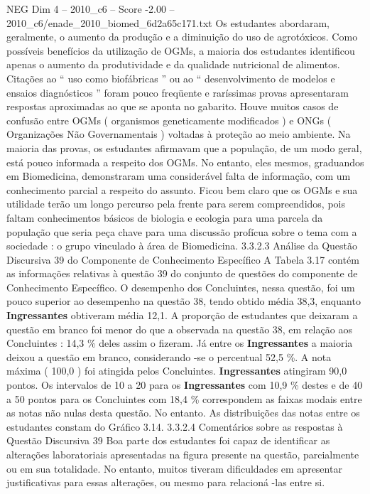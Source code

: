 \begin{textsample}{NEG Dim 4 – 2010\_c6 – Score -2.00 – 2010\_c6/enade\_2010\_biomed\_6d2a65c171.txt}
Os estudantes abordaram, geralmente, o aumento da produção e a diminuição do uso de agrotóxicos.
Como possíveis benefícios da utilização de OGMs, a maioria dos estudantes identificou apenas o aumento da produtividade e da qualidade nutricional de alimentos.
Citações ao “ uso como biofábricas ” ou ao “ desenvolvimento de modelos e ensaios diagnósticos ” foram pouco freqüente e raríssimas provas apresentaram respostas aproximadas ao que se aponta no gabarito.
Houve muitos casos de confusão entre OGMs ( organismos geneticamente modificados ) e ONGs ( Organizações Não Governamentais ) voltadas à proteção ao meio ambiente.
Na maioria das provas, os estudantes afirmavam que a população, de um modo geral, está pouco informada a respeito dos OGMs.
No entanto, eles mesmos, graduandos em Biomedicina, demonstraram uma considerável falta de informação, com um conhecimento parcial a respeito do assunto.
Ficou bem claro que os OGMs e sua utilidade terão um longo percurso pela frente para serem compreendidos, pois faltam conhecimentos básicos de biologia e ecologia para uma parcela da população que seria peça chave para uma discussão profícua sobre o tema com a sociedade : o grupo vinculado à área de Biomedicina. 3.3.2.3 Análise da Questão Discursiva 39 do Componente de Conhecimento Específico A Tabela 3.17 contém as informações relativas à questão 39 do conjunto de questões do componente de Conhecimento Específico.
O desempenho dos Concluintes, nessa questão, foi um pouco superior ao desempenho na questão 38, tendo obtido média 38,3, enquanto \textbf{Ingressantes} obtiveram média 12,1.
A proporção de estudantes que deixaram a questão em branco foi menor do que a observada na questão 38, em relação aos Concluintes : 14,3 \% deles assim o fizeram.
Já entre os \textbf{Ingressantes} a maioria deixou a questão em branco, considerando -se o percentual 52,5 \%.
A nota máxima ( 100,0 ) foi atingida pelos Concluintes. \textbf{Ingressantes} atingiram 90,0 pontos.
Os intervalos de 10 a 20 para os \textbf{Ingressantes} com 10,9 \% destes e de 40 a 50 pontos para os Concluintes com 18,4 \% correspondem as faixas modais entre as notas não nulas desta questão.
No entanto.
As distribuições das notas entre os estudantes constam do Gráfico 3.14. 3.3.2.4 Comentários sobre as respostas à Questão Discursiva 39 Boa parte dos estudantes foi capaz de identificar as alterações laboratoriais apresentadas na figura presente na questão, parcialmente ou em sua totalidade.
No entanto, muitos tiveram dificuldades em apresentar justificativas para essas alterações, ou mesmo para relacioná -las entre si.

\end{textsample}
